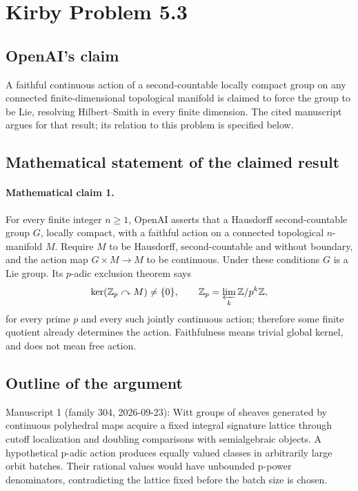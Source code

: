 \documentclass[11pt]{article}
\begin{document}
\section*{Kirby Problem 5.3}

\subsection{OpenAI's claim}
A faithful continuous action of a second-countable locally compact group on any connected finite-dimensional topological manifold is claimed to force the group to be Lie, resolving Hilbert--Smith in every finite dimension. The cited manuscript argues for that result; its relation to this problem is specified below.

\subsection{Mathematical statement of the claimed result}
\paragraph{Mathematical claim 1.} For every finite integer $n\ge1$, OpenAI asserts that a Hausdorff second-countable group $G$, locally compact, with a faithful action on a connected topological $n$-manifold $M$. Require $M$ to be Hausdorff, second-countable and without boundary, and the action map $G\times M\to M$ to be continuous. Under these conditions $G$ is a Lie group. Its $p$-adic exclusion theorem says
\[
\ker(\mathbb Z_p\curvearrowright M)\ne\{0\},\qquad
\mathbb Z_p=\varprojlim_k\mathbb Z/p^k\mathbb Z,
\]
for every prime $p$ and every such jointly continuous action; therefore some finite quotient already determines the action. Faithfulness means trivial global kernel, and does not mean free action.

\subsection{Outline of the argument}
Manuscript 1 (family 304, 2026-09-23): Witt groups of sheaves generated by continuous polyhedral maps acquire a fixed integral signature lattice through cutoff localization and doubling comparisons with semialgebraic objects. A hypothetical p-adic action produces equally valued classes in arbitrarily large orbit batches. Their rational values would have unbounded p-power denominators, contradicting the lattice fixed before the batch size is chosen.
\end{document}
